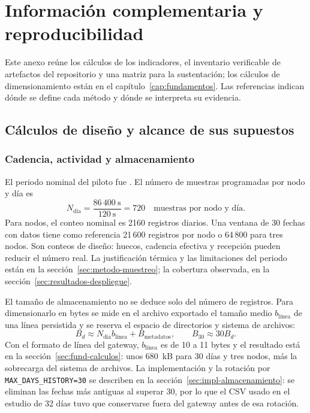 \chapter{Información complementaria y reproducibilidad}
\label{cap:anexos}

Este anexo reúne los cálculos de los indicadores, el inventario verificable de artefactos del repositorio y una matriz para la sustentación; los cálculos de dimensionamiento están en el capítulo~\ref{cap:fundamentos}. Las referencias indican dónde se define cada método y dónde se interpreta su evidencia.

\section{Cálculos de diseño y alcance de sus supuestos}
\label{sec:anexos-calculos}

\subsection{Cadencia, actividad y almacenamiento}

El periodo nominal del piloto fue \PeriodoNominal{}. El número de muestras programadas por nodo y día es
\begin{equation}
N_{\text{día}}=\frac{86\,400~\mathrm{s}}{120~\mathrm{s}}=720
\quad\text{muestras por nodo y día}.
\label{eq:anexo-muestras-dia}
\end{equation}
Para \NumeroNodos{} nodos, el conteo nominal es 2160 registros diarios. Una ventana de 30 fechas con datos tiene como referencia 21\,600 registros por nodo o 64\,800 para tres nodos. Son conteos de diseño: huecos, cadencia efectiva y recepción pueden reducir el número real. La justificación térmica y las limitaciones del periodo están en la sección~\ref{sec:metodo-muestreo}; la cobertura observada, en la sección~\ref{sec:resultados-despliegue}.

El tamaño de almacenamiento no se deduce solo del número de registros. Para dimensionarlo en bytes se mide en el archivo exportado el tamaño medio $b_{\text{línea}}$ de una línea persistida y se reserva el espacio de directorios y sistema de archivos:
\begin{equation}
B_d\approx N_{\text{día}}b_{\text{línea}}+B_{\mathrm{metadatos}},
\qquad B_{30}\approx30B_d.
\label{eq:anexo-almacenamiento}
\end{equation}
Con el formato de línea del gateway, $b_{\text{línea}}$ es de 10 a 11 bytes y el resultado está en la sección~\ref{sec:fund-calculos}: unos 680~kB para 30 días y tres nodos, más la sobrecarga del sistema de archivos. La implementación y la rotación por \texttt{MAX\_DAYS\_HISTORY=30} se describen en la sección~\ref{sec:impl-almacenamiento}: se eliminan las fechas más antiguas al superar 30, por lo que el CSV usado en el estudio de 32 días tuvo que conservarse fuera del gateway antes de esa rotación.

